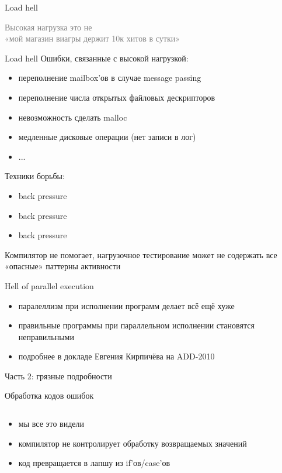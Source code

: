 \documentclass[10pt]{beamer}
\newcommand{\light}[1]{\textcolor{gray}{\footnotesize{#1}}}
\newcommand{\code}[4]{\inputminted[linenos, frame=none, firstline=#2, lastline=#3,
  framesep=10pt, bgcolor=lightgray]{#4}{#1}}
\begin{document}
\begin{frame}{Load hell}
  \begin{center}
    \light{Высокая нагрузка это не\\«мой магазин виагры держит 10к хитов в сутки»}
  \end{center}
\end{frame}

\begin{frame}{Load hell}
  Ошибки, связанные с высокой нагрузкой:
  \begin{itemize}
  \item переполнение mailbox'ов в случае message passing
  \item переполнение числа открытых файловых дескрипторов
  \item невозможность сделать malloc
  \item медленные дисковые операции (нет записи в лог)
  \item ...
  \end{itemize}
  Техники борьбы:
  \begin{itemize}
  \item back pressure
  \item back pressure
  \item back pressure
  \end{itemize}
  Компилятор не помогает, нагрузочное тестирование может не содержать все «опасные» паттерны активности
\end{frame}

\begin{frame}{Hell of parallel execution}
  \begin{itemize}
  \item паралеллизм при исполнении программ делает всё ещё хуже
  \item правильные программы при параллельном исполнении становятся неправильными
  \item подробнее в докладе Евгения Кирпичёва на ADD-2010
  \end{itemize}
\end{frame}

\begin{frame}{}
  \begin{center}
    \huge Часть 2: грязные подробности
  \end{center}
\end{frame}

\begin{frame}{Обработка кодов ошибок}
  \code{code.c}{1}{10}{c}
  \begin{itemize}
  \item мы все это видели
  \item компилятор не контролирует обработку возвращаемых значений
  \item код превращается в лапшу из if'ов/case'ов
  \end{itemize}
\end{frame}
\end{document}
